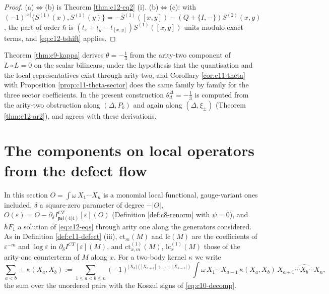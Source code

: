 \begin{proof}
(a)$\Leftrightarrow$(b) is Theorem \ref{thm:c12-eq2} (i). (b)$\Leftrightarrow$(c): with $(-1)^{|x|}\{S^{(1)}(x),S^{(1)}(y)\}=-S^{(1)}([x,y])-(Q+\{I,-\})S^{(2)}(x,y)$, the part of order $\hbar$ is $(t_x+t_y-t_{[x,y]})S^{(1)}([x,y])$ units modulo exact terms, and \eqref{eq:c12-tshift} applies.
\end{proof}

\begin{remark}
\label{rem:c12-thetacheck}
Theorem \ref{thm:c9-kappa} derives $\theta=-\tfrac13$ from the arity-two component of $L\circ L=0$ on the scalar bilinears, under the hypothesis that the quantisation and the local representatives exist through arity two, and Corollary \ref{cor:c11-theta} with Proposition \ref{prop:c11-theta-sector} does the same family by family for the three sector coefficients. In the present construction $\theta^\Delta_d=-\tfrac13$ is computed from the arity-two obstruction along $(\Delta,P_b)$ and again along $(\Delta,\xi_\pm)$ (Theorem \ref{thm:c12-ar2}), and agrees with these derivations.
\end{remark}

\section{The components on local operators from the defect flow}

In this section $O=\int\omega\,X_1\cdots X_n$ is a monomial local functional, gauge-variant ones included, $\delta$ a square-zero parameter of degree $-|O|$, $O(\varepsilon)=O-\partial_\delta I^{CT}_{\mathfrak{psl}(4|4)}[\varepsilon](O)$ (Definition \ref{def:c8-renorm} with $\psi=0$), and $\hbar F_1$ a solution of \eqref{eq:c12-eqs} through arity one along the generators considered. As in Definition \ref{def:c11-defect} (iii), $\mathrm{ct}_m(M)$ and $\mathrm{lc}(M)$ are the coefficients of $\varepsilon^{-m}$ and $\log\varepsilon$ in $\partial_\delta I^{CT}[\varepsilon](M)$, and $\mathrm{ct}^{(1)}_{x,m}(M)$, $\mathrm{lc}^{(1)}_x(M)$ those of the arity-one counterterm of $M$ along $x$. For a two-body kernel $\kappa$ we write
\begin{equation}
\sum_{a<b}\pm\kappa(X_a,X_b):=\sum_{1\le a<b\le n}(-1)^{|X_b|(|X_{a+1}|+\cdots+|X_{b-1}|)}\int\omega\,X_1\cdots X_{a-1}\,\kappa(X_a,X_b)\,X_{a+1}\cdots\widehat{X_b}\cdots X_n,
\label{eq:c12-pairsum}
\end{equation}
the sum over the unordered pairs with the Koszul signs of \eqref{eq:c10-decomp}.

